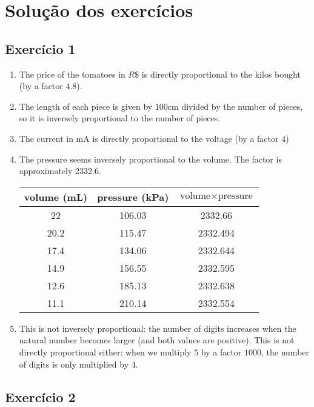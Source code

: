 \section{Solução dos exercícios}

\subsection*{Exercício 1}

\begin{enumerate}
\item The price of the tomatoes in $R\$$
  is directly proportional to the kilos bought (by a factor $4.8$).

\item The length of each piece is given by $100\text{cm}$ divided by the number
  of pieces, so it is inversely proportional to the number
  of pieces.

\item The current in mA is directly proportional to the voltage
  (by a factor $4$)
\item The pressure seems inversely proportional to the volume.
  The factor is approximately 2332.6.

  \begin{tabular}{c | c | c}
volume (mL) & pressure (kPa) & $\text{volume} \times \text{pressure}$ \\
\hline
22 & 106.03 & 2332.66 \\
\hline
20.2 & 115.47 & 2332.494 \\
\hline
17.4 & 134.06 & 2332.644 \\
\hline
14.9 & 156.55 & 2332.595 \\
\hline
12.6 & 185.13 & 2332.638 \\
\hline
11.1 & 210.14 & 2332.554 \\
\hline
\end{tabular}

\item This is not inversely proportional: the number of digits increases
  when the natural number becomes larger (and both values are positive).
  This is not directly proportional
  either: when we multiply $5$ by a factor $1000$, the number of digits is
  only multiplied by $4$.

\end{enumerate}

\subsection*{Exercício 2}

